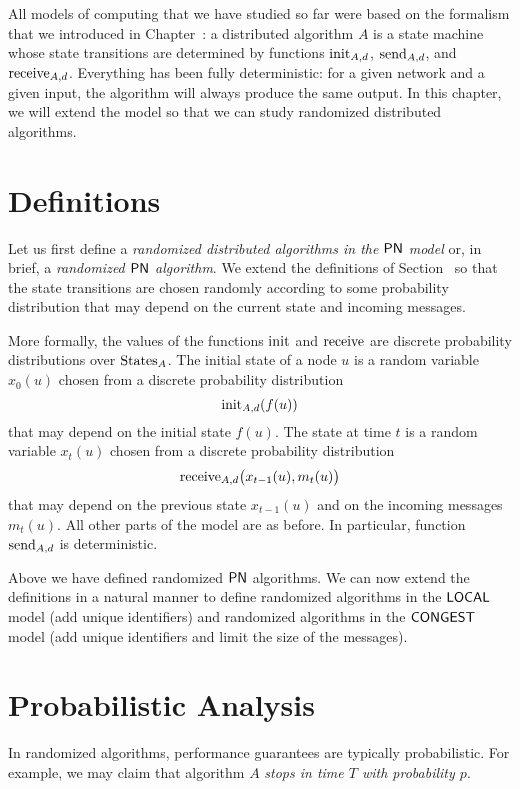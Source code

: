 

\noindent
All models of computing that we have studied so far were based on the formalism that we introduced in Chapter~: a distributed algorithm $A$ is a state machine whose state transitions are determined by functions $\operatorname{init}_{A,d}$, $\operatorname{send}_{A,d}$, and $\operatorname{receive}_{A,d}$. Everything has been fully deterministic: for a given network and a given input, the algorithm will always produce the same output. In this chapter, we will extend the model so that we can study randomized distributed algorithms.


\section{Definitions}\label{sec:randomized}

Let us first define a \emph{randomized distributed algorithms in the $\textup{\sffamily PN}$ model} or, in brief, a \emph{randomized $\textup{\sffamily PN}$ algorithm}. We extend the definitions of Section~ so that the state transitions are chosen randomly according to some probability distribution that may depend on the current state and incoming messages.

More formally, the values of the functions $\operatorname{init}$ and $\operatorname{receive}$ are discrete probability distributions over $\operatorname{States}_A$. The initial state of a node $u$ is a random variable $x_0(u)$ chosen from a discrete probability distribution \[\operatorname{init}_{A,d}(f(u))\] that may depend on the initial state $f(u)$. The state at time $t$ is a random variable $x_t(u)$ chosen from a discrete probability distribution \[\operatorname{receive}_{A,d}\bigl(x_{t-1}(u), m_t(u) \bigr)\] that may depend on the previous state $x_{t-1}(u)$ and on the incoming messages $m_t(u)$. All other parts of the model are as before. In particular, function $\operatorname{send}_{A,d}$ is deterministic.

Above we have defined randomized $\textup{\sffamily PN}$ algorithms. We can now extend the definitions in a natural manner to define randomized algorithms in the $\textup{\sffamily LOCAL}$ model (add unique identifiers) and randomized algorithms in the $\textup{\sffamily CONGEST}$ model (add unique identifiers and limit the size of the messages).


\section{Probabilistic Analysis}

In randomized algorithms, performance guarantees are typically probabilistic. For example, we may claim that algorithm $A$ \emph{stops in time $T$ with probability $p$}.

